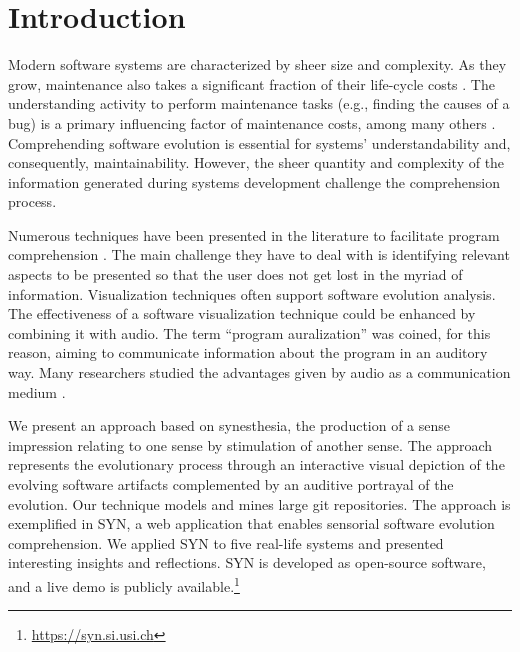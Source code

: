 \documentclass[11pt,twoside,english,singlespacing,headsepline,consistentlayout]{auxiliary/si-msc-thesis}
\author{Gianlorenzo Occhipinti}
\newcommand{\quotes}[1]{``#1''}
\begin{document}
\frontmatter
\pagestyle{plain}




\mainmatter
 
\pagestyle{thesis} 



\section*{Introduction}
Modern software systems are characterized by sheer size and complexity. As they grow, maintenance also takes a significant fraction of their life-cycle costs \cite{Davis1995, Sommerville1995, Erlikh2000, seacord2003}. The understanding activity to perform maintenance tasks (e.g., finding the causes of a bug) is a primary influencing factor of maintenance costs, among many others \cite{Corbi1989}.
Comprehending software evolution is essential for systems' understandability and, consequently, maintainability. However, the sheer quantity and complexity of the information generated during systems development challenge the comprehension process.

Numerous techniques have been presented in the literature to facilitate program comprehension \cite{Lanza2001, DAmbros2006, Steinbrueckner2010, Wettel2011, Alexandru2019, SoftwareEvolution}. The main challenge they have to deal with is identifying relevant aspects to be presented so that the user does not get lost in the myriad of information. Visualization techniques often support software evolution analysis.
The effectiveness of a software visualization technique could be enhanced by combining it with audio. The term \quotes{program auralization} was coined, for this reason, aiming to communicate information about the program in an auditory way.
Many researchers studied the advantages given by audio as a communication medium \cite{Alty1995, Vickers2004, Boccuzzo2009, McIntosh2014, Mancino2017}.

We present an approach based on synesthesia, the production of a sense impression relating to one sense by stimulation of another sense. The approach represents the evolutionary process through an interactive visual depiction of the evolving software artifacts complemented by an auditive portrayal of the evolution. Our technique models and mines large git repositories.
The approach is exemplified in SYN, a web application that enables sensorial software evolution comprehension.
We applied SYN to five real-life systems and presented interesting insights and reflections. SYN is developed as open-source software, and a live demo is publicly available.\footnote{\url{https://syn.si.usi.ch}}
\end{document}
